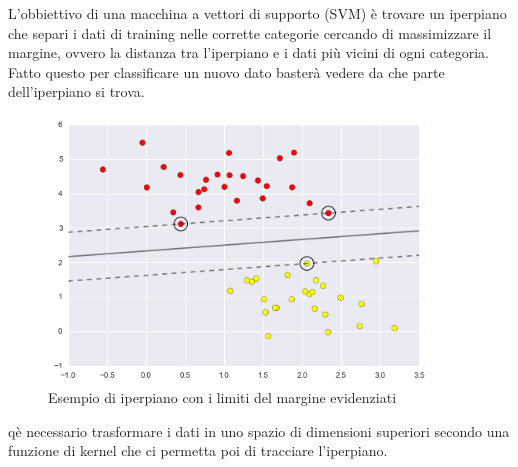 \documentclass[a4paper,12pt]{report}
\begin{document}
L'obbiettivo di una macchina a vettori di supporto (SVM) è trovare un iperpiano
che separi i dati di training nelle corrette categorie cercando di massimizzare
il margine, ovvero la distanza tra l'iperpiano e i dati più vicini di ogni
categoria. Fatto questo per classificare un nuovo dato basterà vedere da che
parte dell'iperpiano si trova.

\begin{figure}[h]
	\includegraphics[width =0.9\textwidth]{Immagini/SVM margine.png}
	\caption{Esempio di iperpiano con i limiti del margine evidenziati \cite{Data science handbook}} 
	
\end{figure}

qè necessario trasformare i dati in uno spazio di dimensioni superiori secondo
una funzione di kernel che ci permetta poi di tracciare l'iperpiano. 
\end{document}
